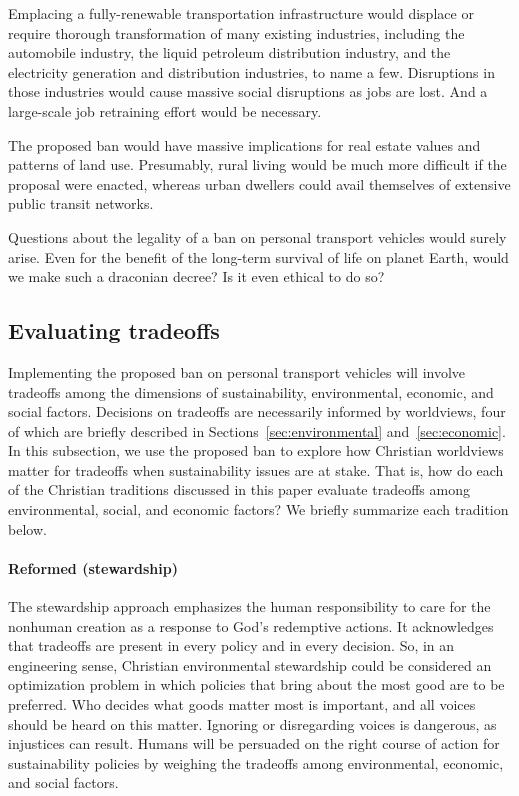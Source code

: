 \documentclass[12pt]{article}
\begin{document}
Emplacing a fully-renewable transportation infrastructure 
would displace or require thorough transformation of many existing industries, including 
the automobile industry, 
the liquid petroleum distribution industry, and
the electricity generation and distribution industries,
to name a few.
Disruptions in those industries 
would cause massive social disruptions 
as jobs are lost.
And a large-scale job retraining effort would be necessary.

The proposed ban would have massive implications for real estate values 
and patterns of land use. 
Presumably, rural living would be much more difficult if the proposal were enacted,
whereas urban dwellers could avail themselves of extensive public transit networks.

Questions about the legality of a ban on personal transport vehicles would surely arise.  
Even for the benefit of the long-term survival of life on planet Earth,
would we make such a draconian decree? 
Is it even ethical to do so?


\subsection{Evaluating tradeoffs}
\label{sec:evaluating_tradeoffs}

Implementing the proposed ban on personal transport vehicles
will involve tradeoffs among the dimensions of sustainability, 
environmental, economic, and social factors.
Decisions on tradeoffs are necessarily informed by worldviews,
four of which are briefly described 
in Sections~\ref{sec:environmental} and~\ref{sec:economic}.
In this subsection, 
we use the proposed ban to explore how Christian worldviews matter 
for tradeoffs when sustainability issues are at stake.
That is, how do each of the Christian traditions discussed in this paper 
evaluate tradeoffs among environmental, social, and economic factors?
We briefly summarize each tradition below.

\paragraph{Reformed (stewardship)} 

The stewardship approach emphasizes the human responsibility 
to care for the nonhuman creation
as a response to God's redemptive actions.
It acknowledges that tradeoffs 
are present in every policy and in every decision. 
So, in an engineering sense, 
Christian environmental stewardship could be considered an optimization problem
in which policies that bring about the most good 
are to be preferred.
Who decides what goods matter most is important, and 
all voices should be heard on this matter.
Ignoring or disregarding voices is dangerous,
as injustices can result. 
Humans will be persuaded on the right course of action
for sustainability policies by weighing the tradeoffs 
among environmental, economic, and social factors.
\end{document}

